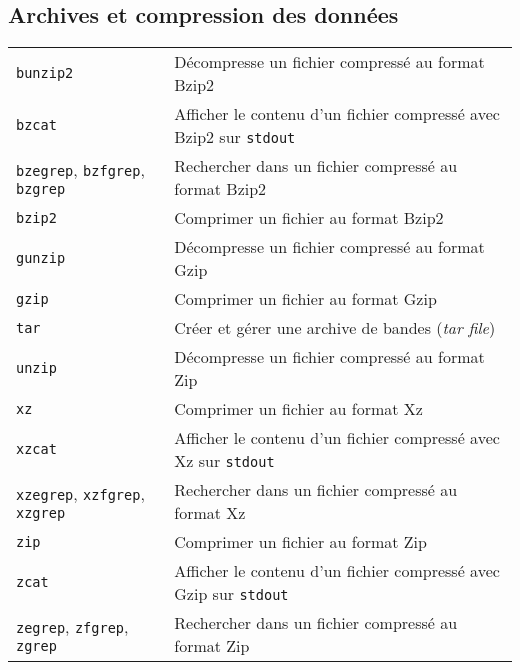 \documentclass[10pt,a4paper]{article}
\begin{document}
\begin{multicols}{2}



\section{Archives et compression des données}
\begin{tabular}{ p{2.75cm} p{8.25cm} }
  \hline 
  \texttt{bunzip2} & Décompresse un fichier compressé au format Bzip2 \\
  \rowcolor{Gray}
  \texttt{bzcat} & Afficher le contenu d'un fichier compressé avec Bzip2 sur \texttt{stdout}\\
  \texttt{bzegrep}, \texttt{bzfgrep}, \texttt{bzgrep} & Rechercher dans un fichier compressé au format Bzip2 \\
  \rowcolor{Gray}
  \texttt{bzip2} & Comprimer un fichier au format Bzip2 \\
  \texttt{gunzip} & Décompresse un fichier compressé au format Gzip \\
  \rowcolor{Gray}
  \texttt{gzip} & Comprimer un fichier au format Gzip \\
  \texttt{tar} & Créer et gérer une archive de bandes (\textit{tar file}) \\
  \rowcolor{Gray}
  \texttt{unzip} & Décompresse un fichier compressé au format Zip \\
  \texttt{xz} & Comprimer un fichier au format Xz \\
  \rowcolor{Gray}
  \texttt{xzcat} & Afficher le contenu d'un fichier compressé avec Xz sur \texttt{stdout} \\
  \texttt{xzegrep}, \texttt{xzfgrep}, \texttt{xzgrep} & Rechercher dans un fichier compressé au format Xz \\
  \rowcolor{Gray}
  \texttt{zip} & Comprimer un fichier au format Zip \\
  \texttt{zcat} & Afficher le contenu d'un fichier compressé avec Gzip sur \texttt{stdout} \\
  \rowcolor{Gray}
  \texttt{zegrep}, \texttt{zfgrep}, \texttt{zgrep} & Rechercher dans un fichier compressé au format Zip \\
  \hline
\end{tabular}

~\hfill


\end{multicols}
\end{document}
